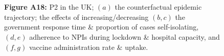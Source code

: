 \documentclass[paper=a4,fontsize=11pt]{article}
\begin{document}
\begin{figure}[!h]
  \\
  \hspace{1.76cm}
  \\
  \caption*{\textbf{Figure A18:} P2 in the UK; $(a)$ the counterfactual epidemic trajectory; the effects of increasing/decreasing $(b,c)$ the government response time \& proportion of cases self-isolating, $(d,e)$ adherence to NPIs during lockdown \& hospital capacity, and $(f,g)$ vaccine administration rate \& uptake.}
\end{figure}
\end{document}
